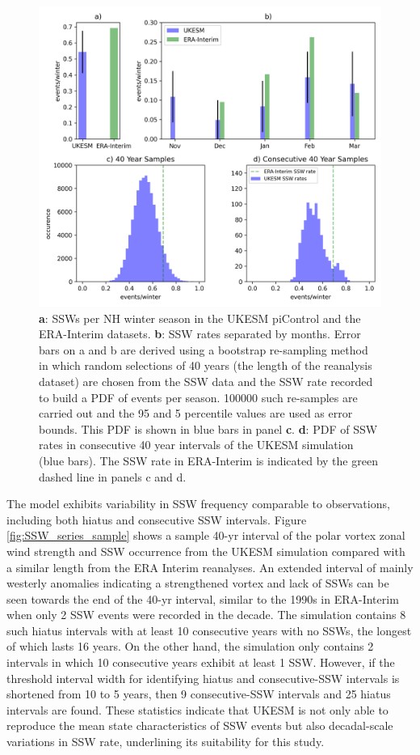 \begin{figure}[h!]
\begin{center}
\noindent\includegraphics[width = 0.8\linewidth]{Figures/Figures-origins/SSW_hist_ERA_UKESM.png}
\caption[SSWs per NH winter season in the UKESM piControl and the ERA-Interim datasets.]{\textbf{a}: SSWs per NH winter season in the UKESM piControl and the ERA-Interim datasets. \textbf{b}: SSW rates separated by months. Error bars on a and b are derived using a bootstrap re-sampling method in which random selections of 40 years (the length of the reanalysis dataset) are chosen from the SSW data and the SSW rate recorded to build a PDF of events per season. 100000 such re-samples are carried out and the 95 and 5 percentile values are used as error bounds. This PDF is shown in blue bars in panel \textbf{c}. \textbf{d}: PDF of SSW rates in consecutive 40 year intervals of the UKESM simulation (blue bars). The SSW rate in ERA-Interim is indicated by the green dashed line in panels c and d.}
\label{fig:SSW_histogram}
\end{center}
\end{figure}

The model exhibits variability in SSW frequency comparable to observations, including both hiatus and consecutive SSW intervals. Figure \ref{fig:SSW_series_sample} shows a sample 40-yr interval of the polar vortex zonal wind strength and SSW occurrence from the UKESM simulation compared with a similar length from the ERA Interim reanalyses. An extended interval of mainly westerly anomalies indicating a strengthened vortex and lack of SSWs can be seen towards the end of the 40-yr interval, similar to the 1990s in ERA-Interim when only 2 SSW events were recorded in the decade. The simulation contains 8 such hiatus intervals with at least 10 consecutive years with no SSWs, the longest of which lasts 16 years. On the other hand, the simulation only contains 2 intervals in which 10 consecutive years exhibit at least 1 SSW. However, if the threshold interval width for identifying hiatus and consecutive-SSW intervals is shortened from 10 to 5 years, then 9 consecutive-SSW intervals and 25 hiatus intervals are found. These statistics indicate that UKESM is not only able to reproduce the mean state characteristics of SSW events but also decadal-scale variations in SSW rate, underlining its  suitability for this study. 

